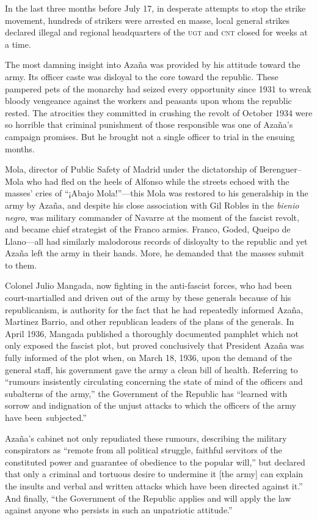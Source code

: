 In the last three months before July 17, in desperate attempts to stop the strike movement, hundreds of strikers were arrested en masse, local general strikes declared illegal and regional headquarters of the \textsc{ugt} and \textsc{cnt} closed for weeks at a time.

The most damning insight into Azaña was provided by his attitude toward the army. Its officer caste was disloyal to the core toward the republic. These pampered pets of the monarchy had seized every opportunity since 1931 to wreak bloody vengeance against the workers and peasants upon whom the republic rested. The atrocities they committed in crushing the revolt of October 1934 were so horrible that criminal punishment of those responsible was one of Azaña’s campaign promises. But he brought not a single officer to trial in the ensuing months.

Mola, director of Public Safety of Madrid under the dictatorship of Berenguer--Mola who had fled on the heels of Alfonso while the streets echoed with the masses’ cries of ``¡Abajo Mola!''---this Mola was restored to his generalship in the army by Azaña, and despite his close association with Gil Robles in the \emph{bienio negro}, was military commander of Navarre at the moment of the fascist revolt, and became chief strategist of the Franco armies. Franco, Goded, Queipo de Llano---all had similarly malodorous records of disloyalty to the republic and yet Azaña left the army in their hands. More, he demanded that the masses submit to them.

Colonel Julio Mangada, now fighting in the anti-fascist forces, who had been court-martialled and driven out of the army by these generals because of his republicanism, is authority for the fact that he had repeatedly informed Azaña, Martinez Barrio, and other republican leaders of the plans of the generals. In April 1936, Mangada published a thoroughly documented pamphlet which not only exposed the fascist plot, but proved conclusively that President Azaña was fully informed of the plot when, on March 18, 1936, upon the demand of the general staff, his government gave the army a clean bill of health. Referring to ``rumours insistently circulating concerning the state of mind of the officers and subalterns of the army,'' the Government of the Republic has ``learned with sorrow and indignation of the unjust attacks to which the officers of the army have been~subjected.''

Azaña’s cabinet not only repudiated these rumours, describing the military conspirators as ``remote from all political struggle, faithful servitors of the constituted power and guarantee of obedience to the popular will,'' but declared that only a criminal and tortuous desire to undermine it [the army] can explain the insults and verbal and written attacks which have been directed against it.'' And finally, ``the Government of the Republic applies and will apply the law against anyone who persists in such an unpatriotic attitude.''

